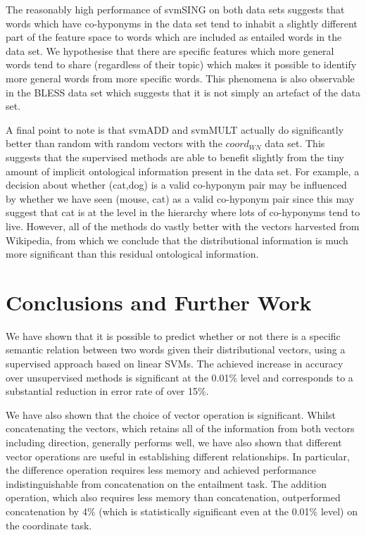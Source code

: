 \documentclass[11pt]{article}
\begin{document}
The reasonably high performance of svmSING on both data sets suggests that words which have co-hyponyms in the data set tend to inhabit a slightly different part of the feature space to words which are included as entailed words in the data set.  We hypothesise that there are specific features which more general words tend to share (regardless of their topic) which makes it possible to identify more general words from more specific words.  This phenomena is also observable in the BLESS data set which suggests that it is not simply an artefact of the data set.

A final point to note is that svmADD and svmMULT actually do significantly better than random with random vectors with the $coord_{WN}$ data set.  This suggests that the supervised methods are able to benefit slightly from the tiny amount of implicit ontological information present in the data set.  For example, a decision about whether (cat,dog) is a valid co-hyponym pair may be influenced by whether we have seen (mouse, cat) as a valid co-hyponym pair since this may suggest that cat is at the level in the hierarchy where lots of co-hyponyms tend to live.  However, all of the methods do vastly better with the vectors harvested from Wikipedia, from which we conclude that the distributional information is much more significant than this residual ontological information.

\section{Conclusions and Further Work}

We have shown that it is possible to predict whether
or not there is a specific semantic relation between two words given
their distributional vectors, using a supervised approach based on linear SVMs. The achieved  increase in accuracy over unsupervised methods is significant at the 0.01\% level and corresponds to a substantial reduction in error rate of over 15\%.

We have also shown that the choice of vector operation is significant.  Whilst concatenating the vectors, which retains all of the information from both vectors including direction, generally performs well, we have also shown that different vector operations are useful in establishing different relationships.  In particular, the difference operation requires less memory and achieved performance indistinguishable from concatenation on the entailment task.  The addition operation, which also requires less memory than concatenation, outperformed concatenation by 4\% (which is statistically significant even at the 0.01\% level) on the coordinate task.
\end{document}
